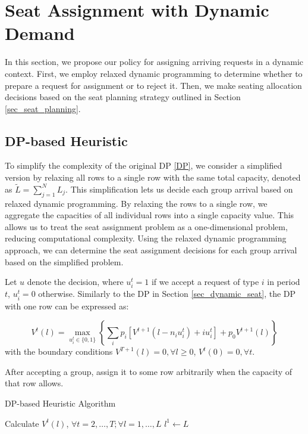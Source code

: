 \section{Seat Assignment with Dynamic Demand}\label{sec_dynamic}
In this section, we propose our policy for assigning arriving requests in a dynamic context. First, we employ relaxed dynamic programming to determine whether to prepare a request for assignment or to reject it. Then, we make seating allocation decisions based on the seat planning strategy outlined in Section \ref{sec_seat_planning}.


\subsection{DP-based Heuristic}
To simplify the complexity of the original DP \eqref{DP}, we consider a simplified version by relaxing all rows to a single row with the same total capacity, denoted as $\tilde{L} = \sum_{j=1}^{N} L_j$. This simplification lets us decide each group arrival based on relaxed dynamic programming. By relaxing the rows to a single row, we aggregate the capacities of all individual rows into a single capacity value. This allows us to treat the seat assignment problem as a one-dimensional problem, reducing computational complexity. Using the relaxed dynamic programming approach, we can determine the seat assignment decisions for each group arrival based on the simplified problem.

Let $u$ denote the decision, where $u_{i}^{t} = 1$ if we accept a request of type $i$ in period $t$, $u_{i}^{t} =0$ otherwise. Similarly to the DP in Section \ref{sec_dynamic_seat}, the DP with one row can be expressed as:

$$V^{t}(l) =  \max_{u_{i}^{t} \in \{0,1\}} \left\{ \sum_{i} p_i [V^{t+1}(l-n_i u_{i}^{t})+ i u_{i}^{t}] + p_0 V^{t+1}(l)\right\} $$
with the boundary conditions $V^{T+1}(l) =0, \forall l \geq 0$, $V^{t}(0) =0, \forall t$.

After accepting a group, assign it to some row arbitrarily when the capacity of that row allows.

\begin{algorithm}[H]
  \caption{DP-based Heuristic Algorithm}\label{algo_dp_heuris}
  Calculate $V^{t}(l)$, $\forall t =2, \ldots, T; \forall l = 1, \ldots, L$\;
  $l^{1} \gets L$\;
\end{algorithm}

